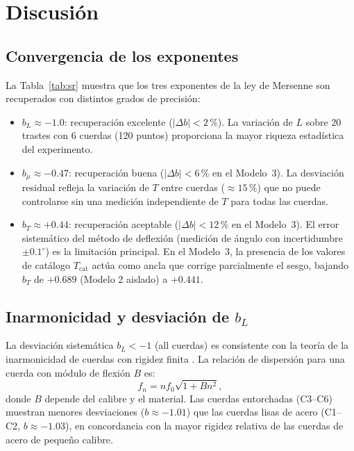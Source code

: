 \documentclass[12pt,a4paper]{article}
\begin{document}
\section{Discusión}

\subsection{Convergencia de los exponentes}

La Tabla~\ref{tab:sr} muestra que los tres exponentes de la ley de Mersenne
son recuperados con distintos grados de precisión:

\begin{itemize}
  \item \textbf{$b_L \approx -1.0$}: recuperación excelente ($|\Delta b| < 2\,\%$).
    La variación de $L$ sobre 20 trastes con 6 cuerdas (120 puntos) proporciona
    la mayor riqueza estadística del experimento.
  \item \textbf{$b_\mu \approx -0.47$}: recuperación buena ($|\Delta b| < 6\,\%$
    en el Modelo~3). La desviación residual refleja la variación de $T$ entre
    cuerdas ($\approx 15\,\%$) que no puede controlarse sin una medición
    independiente de $T$ para todas las cuerdas.
  \item \textbf{$b_T \approx +0.44$}: recuperación aceptable ($|\Delta b| < 12\,\%$
    en el Modelo~3). El error sistemático del método de deflexión (medición
    de ángulo con incertidumbre $\pm 0.1^\circ$) es la limitación principal.
    En el Modelo~3, la presencia de los valores de catálogo $T_\text{cat}$
    actúa como ancla que corrige parcialmente el sesgo, bajando $b_T$ de
    $+0.689$ (Modelo 2 aislado) a $+0.441$.
\end{itemize}

\subsection{Inarmonicidad y desviación de $b_L$}

La desviación sistemática $b_L < -1$ (all cuerdas) es consistente con la
teoría de la inarmonicidad de cuerdas con rigidez finita \cite{fletcher1964}.
La relación de dispersión para una cuerda con módulo de flexión $B$ es:
\begin{equation}
  f_n = n f_0 \sqrt{1 + B n^2},
\end{equation}
donde $B$ depende del calibre y el material. Las cuerdas entorchadas (C3–C6)
muestran menores desviaciones ($b \approx -1.01$) que las cuerdas lisas
de acero (C1–C2, $b \approx -1.03$), en concordancia con la mayor
rigidez relativa de las cuerdas de acero de pequeño calibre.
\end{document}
